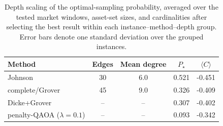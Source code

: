 \begin{table}[t]
\centering
\caption{
Depth scaling of the optimal-sampling probability, averaged over the tested
market windows, asset-set sizes, and cardinalities after selecting the best
result within each instance--method--depth group. Error bars denote one
standard deviation over the grouped instances. 
}
\label{tab:single-instance-compact}
\begin{tabular}{lcccc}
\toprule
Method & Edges & Mean degree & $P_\star$ & $\langle C\rangle$\\
\midrule
Johnson & 30 & 6.0 & 0.521 & -0.451\\
complete/Grover & 45 & 9.0 & 0.326 & -0.409\\
Dicke+Grover & -- & -- & 0.307 & -0.402\\
penalty-QAOA ($\lambda=0.1$) & -- & -- & 0.093 & -0.342\\
\bottomrule
\end{tabular}
\end{table}
